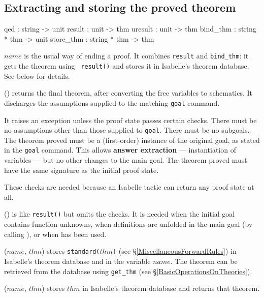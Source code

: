 \subsection{Extracting and storing the proved theorem}
\label{ExtractingAndStoringTheProvedTheorem}
\begin{ttbox} 
qed       : string -> unit
result    : unit -> thm
uresult   : unit -> thm
bind_thm  : string * thm -> unit
store_thm : string * thm -> thm
\end{ttbox}
\begin{ttdescription}
\item[\ttindexbold{qed} $name$] is the usual way of ending a proof.
  It combines {\tt result} and {\tt bind_thm}: it gets the theorem using {\tt
  result()} and stores it in Isabelle's theorem database.  See below for
  details. 

\item[\ttindexbold{result}()]
  returns the final theorem, after converting the free variables to
  schematics.  It discharges the assumptions supplied to the matching 
  {\tt goal} command.  

  It raises an exception unless the proof state passes certain checks.  There
  must be no assumptions other than those supplied to {\tt goal}.  There
  must be no subgoals.  The theorem proved must be a (first-order) instance
  of the original goal, as stated in the {\tt goal} command.  This allows
  {\bf answer extraction} --- instantiation of variables --- but no other
  changes to the main goal.  The theorem proved must have the same signature
  as the initial proof state.

  These checks are needed because an Isabelle tactic can return any proof
  state at all.

\item[\ttindexbold{uresult}()] is like {\tt result()} but omits the checks.
  It is needed when the initial goal contains function unknowns, when
  definitions are unfolded in the main goal (by calling
  ), or when
   has been used.

\item[\ttindexbold{bind_thm}($name$, $thm$)]
  stores {\tt standard($thm$)} (see \S\ref{MiscellaneousForwardRules})
  in Isabelle's theorem database and in the {\ML} variable $name$.  The
  theorem can be retrieved from the database using {\tt get_thm}
  (see \S\ref{BasicOperationsOnTheories}).

\item[\ttindexbold{store_thm}($name$, $thm$)] stores
  $thm$ in Isabelle's theorem database and returns that theorem.
\end{ttdescription}


